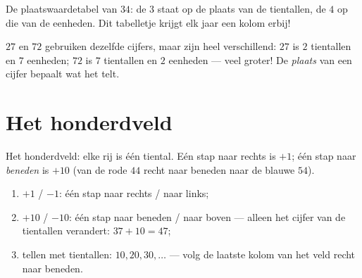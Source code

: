 \begin{omfigure}

{\small De plaatswaardetabel van $34$: de $3$ staat op de plaats van de
tientallen, de $4$ op die van de eenheden. Dit tabelletje krijgt elk
jaar een kolom erbij!}
\end{omfigure}

\begin{example}\label{ex:g1:tens:place}
$27$ en $72$ gebruiken dezelfde cijfers, maar zijn heel verschillend:
$27$ is $2$ tientallen en $7$ eenheden; $72$ is $7$ tientallen en $2$
eenheden --- veel groter! De \emph{plaats} van een cijfer bepaalt wat
het telt.
\end{example}

\section{Het honderdveld}

\begin{omfigure}

{\small Het honderdveld: elke rij is één tiental. Eén stap naar rechts
is $+1$; één stap naar \emph{beneden} is $+10$ (van de rode $44$
recht naar beneden naar de blauwe $54$).}
\end{omfigure}

\begin{method}\label{met:g1:tens:grid}
\begin{enumerate}
  \item $+1$ / $-1$: één stap naar rechts / naar links;
  \item $+10$ / $-10$: één stap naar beneden / naar boven --- alleen
        het cijfer van de tientallen verandert: $37 + 10 = 47$;
  \item tellen met tientallen: $10, 20, 30, \dots$ --- volg de laatste
        kolom van het veld recht naar beneden.
\end{enumerate}
\end{method}

